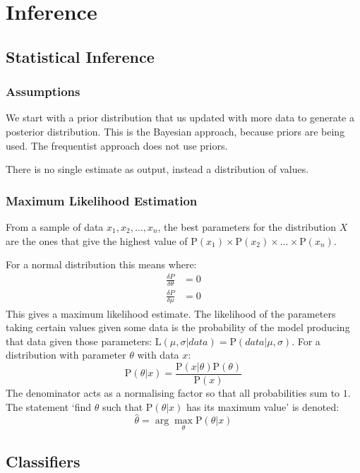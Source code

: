 \chapter{Inference}
\section{Statistical Inference}
\subsection{Assumptions}
We start with a prior distribution that us updated with more data to generate a posterior distribution. This is the Bayesian approach, because priors are being used. The frequentist approach does not use priors.

There is no single estimate as output, instead a distribution of values.

\subsection{Maximum Likelihood Estimation}
From a sample of data \(x_1, x_2, \dots, x_n\), the best parameters for the distribution \(X\) are the ones that give the highest value of \(\mathrm{P}(x_1) \times \mathrm{P}(x_2) \times \dots \times \mathrm{P}(x_n)\).

For a normal distribution this means where:
\begin{align*}
    \frac{\delta P}{\delta \theta} & = 0 \\
    \frac{\delta P}{\delta \mu}    & = 0
\end{align*}
This gives a maximum likelihood estimate. The likelihood of the parameters taking certain values given some data is the probability of the model producing that data given those parameters: \(\mathrm{L}(\mu, \sigma | data) = \mathrm{P}(data | \mu, \sigma)\).
For a distribution with parameter \(\theta\) with data \(x\):
\begin{equation}
    \mathrm{P}(\theta | x) = \frac{\mathrm{P}(x | \theta)\mathrm{P}(\theta)}{\mathrm{P}(x)}
\end{equation}
The denominator acts as a normalising factor so that all probabilities sum to \(1\). The statement `find \(\theta\) such that \(\mathrm{P}(\theta|x)\) has its maximum value' is denoted:
\begin{equation*}
    \hat{\theta} = \arg \max_\theta \mathrm{P}(\theta|x)
\end{equation*}

\section{Classifiers}
